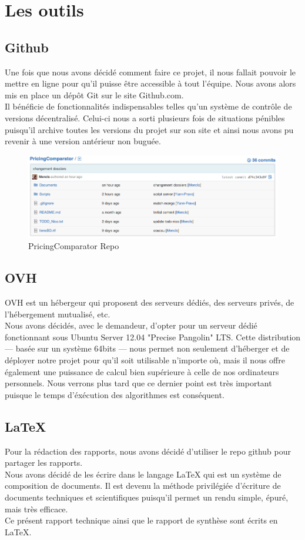 \documentclass{report}
\begin{document}
\section{Les outils}
\subsection{Github}
Une fois que nous avons décidé comment faire ce projet, il nous fallait pouvoir le mettre en ligne pour qu’il puisse être accessible à tout l'équipe. Nous avons alors mis en place un dépôt Git sur le site Github.com. \\
Il bénéficie de fonctionnalités indispensables telles qu’un système de contrôle de versions décentralisé. Celui-ci nous a sorti plusieurs fois de situations pénibles puisqu’il archive toutes les versions du projet sur son site et ainsi nous avons pu revenir à une version antérieur non buguée.
\begin{figure}[h]
\includegraphics[scale = 0.5]{./img/github.png}
\caption{PricingComparator Repo}
\end{figure}

\subsection{OVH}
OVH est un hébergeur qui proposent des serveurs dédiés, des serveurs privés, de l'hébergement mutualisé, etc.\\
Nous avons décidés, avec le demandeur, d'opter pour un serveur dédié fonctionnant sous Ubuntu Server 12.04 "Precise Pangolin" LTS. Cette distribution — basée sur un système 64bits — nous permet non seulement d'héberger et de déployer notre projet pour qu'il soit utilisable n'importe où, mais il nous offre également une puissance de calcul bien supérieure à celle de nos ordinateurs personnels. Nous verrons plus tard que ce dernier point est très important puisque le temps d'éxécution des algorithmes est conséquent.

\subsection{LaTeX}
Pour la rédaction des rapports, nous avons décidé d'utiliser le repo github pour partager les rapports.\\
Nous avons décidé de les écrire dans le langage LaTeX qui est un système de composition de documents. Il est devenu la méthode privilégiée d'écriture de documents techniques et scientifiques puisqu'il permet un rendu simple, épuré, mais très efficace.\\
Ce présent rapport technique ainsi que le rapport de synthèse sont écrits en LaTeX.
\end{document}
